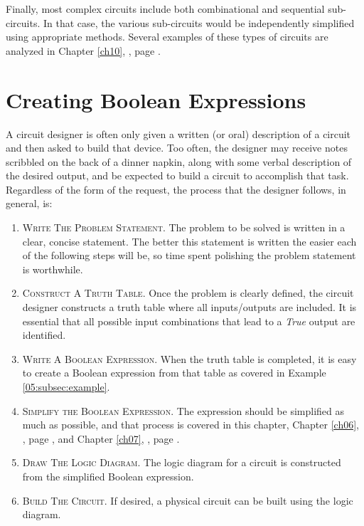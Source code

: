 Finally, most complex circuits include both combinational and sequential sub-circuits. In that case, the various sub-circuits would be independently simplified using appropriate methods. Several examples of these types of circuits are analyzed in Chapter \ref{ch10}, , page \pageref{ch10}.

\section{Creating Boolean Expressions}

A circuit designer is often only given a written (or oral) description of a circuit and then asked to build that device. Too often, the designer may receive notes scribbled on the back of a dinner napkin, along with some verbal description of the desired output, and be expected to build a circuit to accomplish that task. Regardless of the form of the request, the process that the designer follows, in general, is: 

\begin{enumerate}
  \item \textsc{Write The Problem Statement}. The problem to be solved is written in a clear, concise statement. The better this statement is written the easier each of the following steps will be, so time spent polishing the problem statement is worthwhile. 
  
  \item \textsc{Construct A Truth Table}. Once the problem is clearly defined, the circuit designer constructs a truth table where all inputs/outputs are included. It is essential that all possible input combinations that lead to a \emph{True} output are identified. 
  
  \item \textsc{Write A Boolean Expression}. When the truth table is completed, it is easy to create a Boolean expression from that table as covered in Example \ref{05:subsec:example}. 
  
  \item \textsc{Simplify the Boolean Expression}. The expression should be simplified as much as possible, and that process is covered in this chapter, Chapter \ref{ch06}, , page \pageref{ch06}, and Chapter \ref{ch07}, , page \pageref{ch07}. 
  
  \item \textsc{Draw The Logic Diagram}. The logic diagram for a circuit is constructed from the simplified Boolean expression. 
  
  \item \textsc{Build The Circuit}. If desired, a physical circuit can be built using the logic diagram. 
\end{enumerate}

